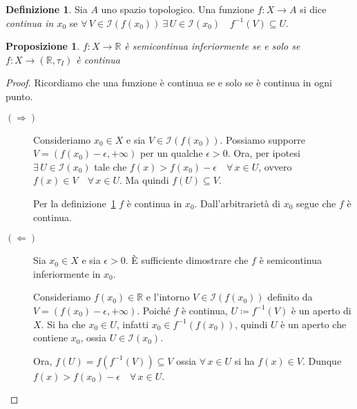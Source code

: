 \documentclass[a4paper, 11pt]{article}
\newcommand{\R}{\mathbb{R}}
\newcommand{\I}[1]{\mathcal{I}(#1)}
\theoremstyle{plain} 	%
\newtheorem{proposizione}{Proposizione}
\theoremstyle{definition}
\newtheorem{definizione}{Definizione}
\theoremstyle{remark}
\begin{document}
    \begin{definizione}\label{def:cont_pt}
        Sia $A$ uno spazio topologico. Una funzione $f\colon X\to A$ si dice \emph{continua in $x_0$} se $\forall\,V\in\I{f(x_0)}\ \exists\,U\in\I{x_0}\quad f^{-1}\left(V\right)\subseteq U$.
    \end{definizione}

    \begin{proposizione}\label{prop:con_top}
        $f\colon X\to\R$ è semicontinua inferiormente se e solo se $f\colon X\to\left(\R,\tau_I\right)$ è continua
    \end{proposizione}
    \begin{proof} Ricordiamo che una funzione è continua se e solo se è continua in ogni punto.
        \begin{description}
            \item[$\left(\Longrightarrow\right)$] Consideriamo $x_0\in X$ e sia $V\in\I{f(x_0)}$. Possiamo supporre $V=(f(x_0)-\epsilon,+\infty)$ per un qualche $\epsilon>0$. Ora, per ipotesi $\exists\,U\in\I{x_0}$ tale che $f(x)>f(x_0)-\epsilon\quad\forall\,x\in U$, ovvero $f(x)\in V\quad\forall\,x\in U$. Ma quindi $f\left(U\right)\subseteq V$. 

            Per la definizione~\ref{def:cont_pt} $f$ è continua in $x_0$. Dall'arbitrarietà di $x_0$ segue che $f$ è continua.
            \item[$\left(\Longleftarrow\right)$] Sia $x_0\in X$ e sia $\epsilon>0$. \`E sufficiente dimostrare che $f$ è semicontinua inferiormente in $x_0$.
            
            Consideriamo $f(x_0)\in\R$ e l'intorno $V\in\I{f(x_0)}$ definito da $V=(f(x_0)-\epsilon,+\infty)$. Poiché $f$ è continua, $U\coloneqq f^{-1}\left(V\right)$ è un aperto di $X$. Si ha che $x_0\in U$, infatti $x_0\in f^{-1}(f(x_0))$, quindi $U$ è un aperto che contiene $x_0$, ossia $U\in\I{x_0}$. 

            Ora, $f\left(U\right)=f\left(f^{-1}(V)\right)\subseteq V$ ossia $\forall\,x\in U$ si ha $f(x)\in V$. Dunque $f(x)>f(x_0)-\epsilon\quad\forall\,x\in U$. \qedhere
        \end{description}
    \end{proof}
\end{document}
